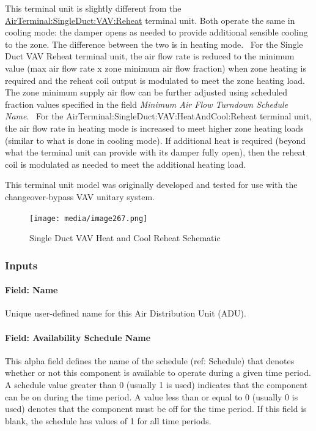 This terminal unit is slightly different from the \hyperref[airterminalsingleductvavreheat]{AirTerminal:SingleDuct:VAV:Reheat} terminal unit. Both operate the same in cooling mode: the damper opens as needed to provide additional sensible cooling to the zone. The difference between the two is in heating mode.~ For the Single Duct VAV Reheat terminal unit, the air flow rate is reduced to the minimum value (max air flow rate x zone minimum air flow fraction) when zone heating is required and the reheat coil output is modulated to meet the zone heating load. The zone minimum supply air flow can be further adjusted using scheduled fraction values specified in the field \textit{Minimum Air Flow Turndown Schedule Name}.~ For the AirTerminal:SingleDuct:VAV:HeatAndCool:Reheat terminal unit, the air flow rate in heating mode is increased to meet higher zone heating loads (similar to what is done in cooling mode). If additional heat is required (beyond what the terminal unit can provide with its damper fully open), then the reheat coil is modulated as needed to meet the additional heating load.

This terminal unit model was originally developed and tested for use with the changeover-bypass VAV unitary system.

\begin{figure}[hbtp] %
\centering
\texttt{[image: media/image267.png]}
\caption{Single Duct VAV Heat and Cool Reheat Schematic \protect \label{fig:single-duct-vav-heat-and-cool-reheat}}
\end{figure}

\subsubsection{Inputs}\label{inputs-4-000}

\paragraph{Field: Name}\label{field-name-4-000}

Unique user-defined name for this Air Distribution Unit (ADU).

\paragraph{Field: Availability Schedule Name}\label{field-availability-schedule-name-4}

This alpha field defines the name of the schedule (ref: Schedule) that denotes whether or not this component is available to operate during a given time period. A schedule value greater than 0 (usually 1 is used) indicates that the component can be on during the time period. A value less than or equal to 0 (usually 0 is used) denotes that the component must be off for the time period. If this field is blank, the schedule has values of 1 for all time periods.

